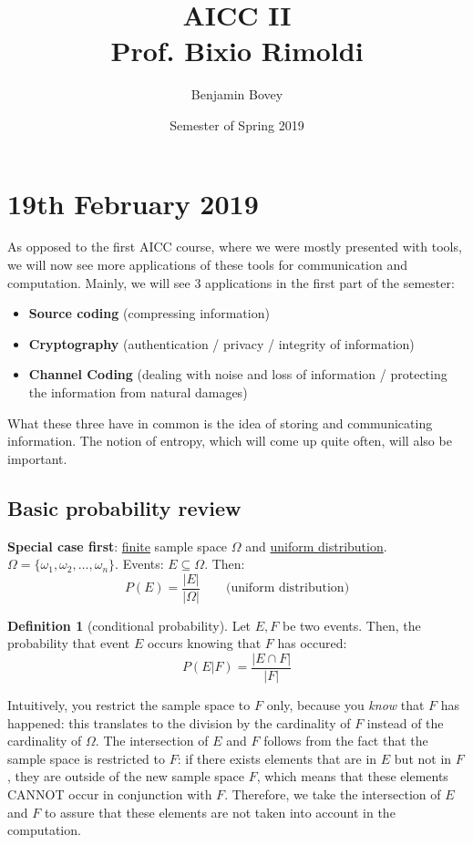 \documentclass{report}
\title{AICC II \\ Prof. Bixio Rimoldi}
\author{Benjamin Bovey}
\date{Semester of Spring 2019}
\theoremstyle{plain}
\theoremstyle{definition}
\newtheorem{defn}[thm]{Definition}
\theoremstyle{remark}
\begin{document}
\maketitle


\section{19th February 2019}
As opposed to the first AICC course, where we were mostly presented with tools, we will now see more applications of these tools for communication and computation. Mainly, we will see 3 applications in the first part of the semester:
\begin{itemize}
	\item \textbf{Source coding} (compressing information)
	\item \textbf{Cryptography} (authentication / privacy / integrity of information)
	\item \textbf{Channel Coding} (dealing with noise and loss of information / protecting the information from natural damages)
\end{itemize}
What these three have in common is the idea of storing and communicating information. The notion of entropy, which will come up quite often, will also be important.

\subsection{Basic probability review}
\textbf{Special case first}: \underline{finite} sample space $\Omega$ and \underline{uniform distribution}. $\Omega = \{\omega_1, \omega_2, \dots, \omega_n\}$. Events: $E \subseteq \Omega$. Then:
\begin{equation}
	P(E) = \dfrac{|E|}{|\Omega|} \qquad \text{(uniform distribution)}
\end{equation}

\begin{defn}[conditional probability]
Let $E, F$ be two events. Then, the probability that event $E$ occurs knowing that $F$ has occured:
\begin{equation}
	P(E|F) = \dfrac{|E \cap F|}{|F|}
\end{equation}
\end{defn}
Intuitively, you restrict the sample space to $F$ only, because you \emph{know} that $F$ has happened: this translates to the division by the cardinality of $F$ instead of the cardinality of $\Omega$. The intersection of $E$ and $F$ follows from the fact that the sample space is restricted to $F$: if there exists elements that are in $E$ but not in $F$, they are outside of the new sample space $F$, which means that these elements CANNOT occur in conjunction with $F$. Therefore, we take the intersection of $E$ and $F$ to assure that these elements are not taken into account in the computation.
\end{document}
